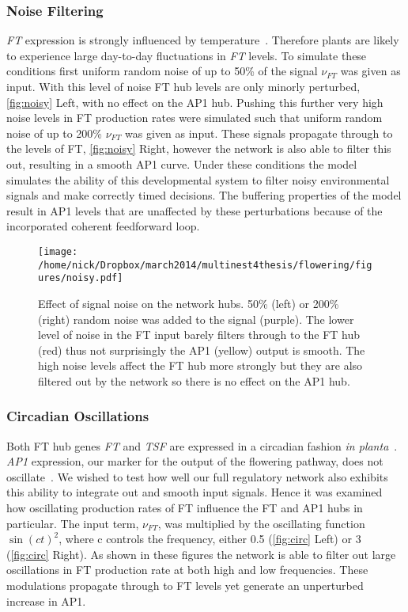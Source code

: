 \subsubsection{Noise Filtering}

\emph{FT} expression is strongly influenced by temperature~\cite{balasubramanian2006}.
Therefore plants are likely to experience large day-to-day fluctuations in \emph{FT} levels.
To simulate these conditions first uniform random noise of up to 50\% of the signal $\nu_{FT}$ was given as input.
With this level of noise FT hub levels are only minorly perturbed, \autoref{fig:noisy} Left, with no effect on the AP1 hub.
Pushing this further very high noise levels in FT production rates were simulated such that uniform random noise of up to 200\% $\nu_{FT}$ was given as input.
These signals propagate through to the levels of FT, \autoref{fig:noisy} Right, however the network is also able to filter this out, resulting in a smooth AP1 curve.
Under these conditions the model simulates the ability of this developmental system to filter noisy environmental signals and make correctly timed decisions.
The buffering properties of the model result in AP1 levels that are unaffected by these perturbations because of the incorporated coherent feedforward loop.
\begin{figure*}[!htb]
\centering
\texttt{[image: /home/nick/Dropbox/march2014/multinest4thesis/flowering/figures/noisy.pdf]}
\caption{Effect of signal noise on the network hubs.
50\% (left) or 200\% (right) random noise was added to the signal (purple).
The lower level of noise in the FT input barely filters through to the FT hub (red) thus not surprisingly the AP1 (yellow) output is smooth.
The high noise levels affect the FT hub more strongly but they are also filtered out by the network so there is no effect on the AP1 hub.
}
\label{fig:noisy}
\end{figure*}

\subsubsection{Circadian Oscillations}
Both FT hub genes \emph{FT} and \emph{TSF} are expressed in a circadian fashion \emph{in planta}~\cite{suarezlopez2001,yamaguchi2005}.
\emph{AP1} expression, our marker for the output of the flowering pathway, does not oscillate~\cite{sundstrom2006}.
We wished to test how well our full regulatory network also exhibits this ability to integrate out and smooth input signals.
Hence it was examined how oscillating production rates of FT influence the FT and AP1 hubs in particular.
The input term, $\nu_{FT}$, was multiplied by the oscillating function $\sin(ct)^2$, where c controls the frequency, either 0.5 (\autoref{fig:circ} Left) or 3 (\autoref{fig:circ} Right).
As shown in these figures the network is able to filter out large oscillations in FT production rate at both high and low frequencies.
These modulations propagate through to FT levels yet generate an unperturbed increase in AP1.

